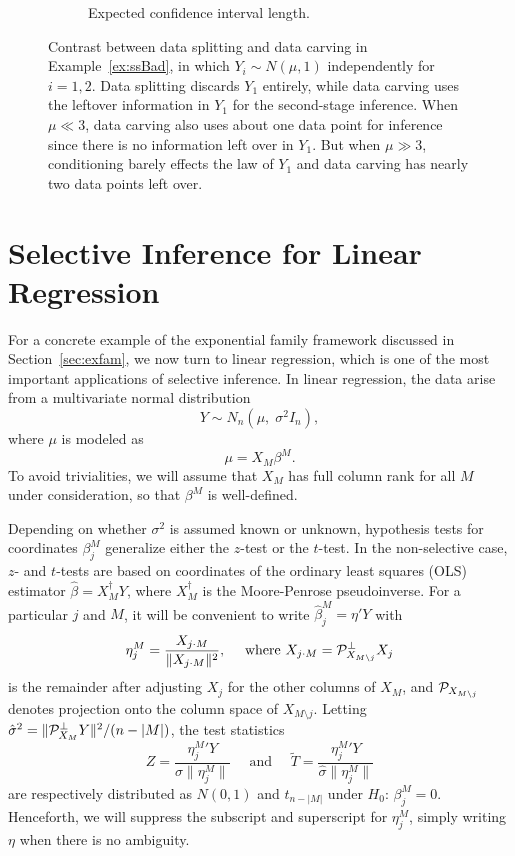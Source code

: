 \documentclass{article}
\theoremstyle{definition}
\newcommand{\bX}{X}
\newcommand{\proj}{\cP}
\newcommand{\sampOrData}{data }
\newcommand{\capSampOrData}{Data }
\begin{document}
\begin{figure}
\begin{subfigure}[t]{.4\textwidth}
    \caption{Expected confidence interval length.}
    \label{fig:ssBad:ci}
  \end{subfigure}
  \caption{Contrast between \sampOrData splitting and \sampOrData carving in Example~\ref{ex:ssBad}, in which $Y_{i}\sim N(\mu,1)$ independently for $i=1,2$. \capSampOrData splitting
discards $Y_{1}$ entirely, while \sampOrData carving uses the leftover information in $Y_{1}$ for the second-stage inference. When $\mu\ll 3$, \sampOrData carving also uses about one data point for inference since there is no information left over in $Y_{1}$. But when $\mu\gg 3$, conditioning barely effects the law of $Y_{1}$ and \sampOrData carving has nearly two data points left over.}
  \label{fig:ssBad}
\end{figure}




\section{Selective Inference for Linear Regression}\label{sec:linReg}

For a concrete example of the exponential family framework discussed in Section~\ref{sec:exfam}, we now turn to linear regression, which is one of the most important applications of selective inference. In linear regression, the data arise from a multivariate normal distribution
\[Y \sim N_n(\mu, \;\sigma^2 I_n), \]
where $\mu$ is modeled as
\begin{equation}\label{eq:subModel}
  \mu = \bX_M \beta^{M}.
\end{equation}
To avoid trivialities, we will assume that $\bX_M$ has full column rank for all $M$ under consideration, so that $\beta^{M}$ is well-defined.

Depending on whether $\sigma^2$ is assumed known or unknown, hypothesis tests for coordinates $\beta_j^{M}$ generalize either the $z$-test or the $t$-test. In the non-selective case, $z$- and $t$-tests are based on coordinates of the ordinary least squares (OLS) estimator $\hat\beta = \bX_M^\dagger Y$, where  $\bX_M^\dagger$ is the Moore-Penrose pseudoinverse. For a particular $j$ and $M$, it will be convenient to write $\hat\beta_j^M = \eta'Y$ with
\begin{equation}
  {\eta_j^M}= \frac{X_{j\cdot M}}{\|X_{j\cdot M}\|^2}, \quad \text{ where } X_{j\cdot M} = \proj_{\bX_{M\setminus j}}^\perp X_j
\end{equation}
is the remainder after adjusting $X_j$ for the other columns of $X_M$, and $\proj_{\bX_{M\setminus j}}$ denotes projection onto the column space of $\bX_{M\setminus j}$. Letting $\hat\sigma^2=\|\proj_{\bX_M}^\perp Y\|^2/(n-|M|)$, the test statistics
\begin{equation}\label{eq:testStats}
  Z = \frac{{\eta_j^M}'Y}{\sigma \|{\eta_j^M}\|} \quad \text{ and } \quad \widetilde T = \frac{{\eta_j^M}'Y}{\hat\sigma \|{\eta_j^M}\|}
\end{equation}
are respectively distributed as $N(0,1)$ and $t_{n-|M|}$ under $H_0:\, \beta_j^M = 0$. Henceforth, we will suppress the subscript and superscript for $\eta_j^M$, simply writing $\eta$ when there is no ambiguity.
\end{document}
